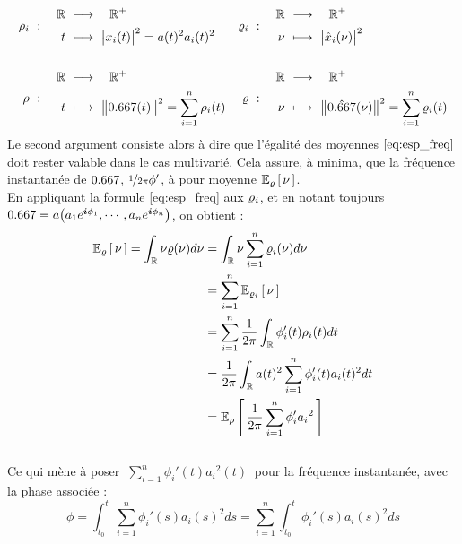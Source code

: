 \begin{align*}%
	\densit_i\ &:\quad \begin{aligned}\R\ &\lr\quad \R^+ \\ t\ &\longmapsto\ \big|x_i(t)\big|^2 = a(t)^2 a_i(t)^2 \end{aligned}  
	&
	\densis_i\ &:\quad \begin{aligned}\R\ &\lr\quad \R^+ \\ \nu\ &\longmapsto\ \big|\fou{x}_i(\nu)\big|^2 \end{aligned} \\ \\
	\densit\ &:\quad \begin{aligned}\R\ &\lr\quad \R^+ \\ t\ &\longmapsto\ \big\|\x(t)\big\|^2 = \sum_{i=1}^n \densit_i(t) \end{aligned}  
	&
	\densis\ &:\quad \begin{aligned}\R\ &\lr\quad \R^+ \\ \nu\ &\longmapsto\ \big\|\fou{\x}(\nu)\big\|^2 = \sum_{i=1}^n \densis_i(t) \end{aligned}	
\end{align*}
Le second argument consiste alors à dire que l'égalité des moyennes $\eqref{eq:esp_freq}$ doit rester valable dans le cas multivarié. Cela assure, à minima, que la fréquence instantanée de $\x$, $\nicefrac{1}{2\pi}\phi'$, à pour moyenne $\esp[\densis]{\nu}$.
\\

En appliquant la formule \eqref{eq:esp_freq} aux $\densis_i$, et en notant toujours $\x = a\big(a_1e^{\i \phi_1}, \cdots, a_ne^{\i \phi_n}\big)$, on obtient :
\begin{align*}
	\esp[\densis]{\nu} = \int_\R \nu\densis(\nu)d\nu &= \int_\R \nu\sum_{i=1}^n \densis_i(\nu) d\nu \\
	&= \sum_{i=1}^n\esp[\densis_i]{\nu} \\
	&= \sum_{i=1}^n\frac{1}{2\pi}\int_\R \phi_i'(t)\densit_i(t)dt \\
	&= \frac{1}{2\pi}\int_\R a(t)^2\sum_{i=1}^n\phi_i'(t)a_i(t)^2 dt \\
	&= \esp[\densit]{\frac{1}{2\pi}\sum_{i=1}^n \phi_i'{a_i}^2}
\end{align*}
\\
Ce qui mène à poser $\displaystyle \ \sum_{i=1}^n \phi_i'(t){a_i}^2(t)\ $ pour la fréquence instantanée, avec la phase associée :
\begin{equation}\label{eq:phas_inst_v2}
	\phi = \int_{t_0}^t \sum_{i=1}^n \phi_i'(s){a_i}(s)^2ds 
	= \sum_{i=1}^n \int_{t_0}^t \phi_i'(s){a_i}(s)^2ds 
\end{equation}
\\

